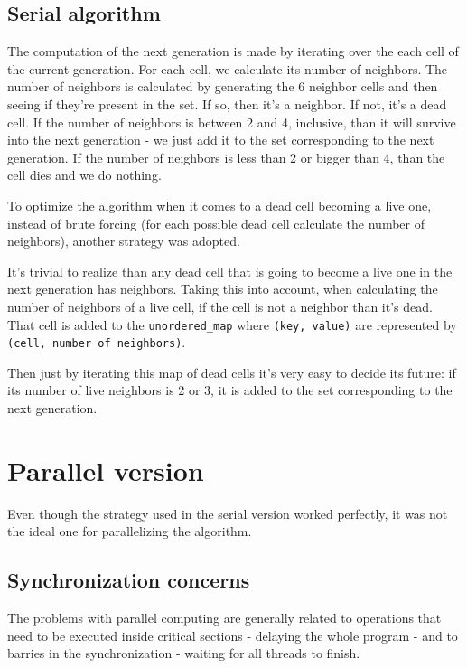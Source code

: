 \documentclass[11pt,english]{article}
\begin{document}
\subsection{Serial algorithm}

The computation of the next generation is made by iterating over the each cell 
of the current generation. For each cell, we calculate its number of neighbors.
The number of neighbors is calculated by generating the 6 neighbor cells and 
then seeing if they're present in the set. If so, then it's a neighbor. If not, 
it's a dead cell.
If the number of neighbors is between 2 and 4, inclusive, than it will survive 
into the next generation - we just add it to the set corresponding to the next 
generation. If the number of neighbors is less than 2 or bigger than 4, than 
the cell dies and we do nothing. 

To optimize the algorithm when it comes to a dead cell becoming a live one, 
instead of brute forcing (for each possible dead cell calculate the number of 
neighbors), another strategy was adopted. 

It's trivial to realize than any dead cell that is going to become a live one 
in the next generation has neighbors. Taking this into account, when calculating 
the number of neighbors of a live cell, if the cell is not a neighbor than it's
dead. That cell is added to the \texttt{unordered\_map} where 
\texttt{(key, value)} are represented by \texttt{(cell, number of neighbors)}. 

Then just by iterating this map of dead cells it's very easy to decide its 
future: if its number of live neighbors is 2 or 3, it is added to the set 
corresponding to the next generation.

\section{Parallel version}

Even though the strategy used in the serial version worked perfectly, it was 
not the ideal one for parallelizing the algorithm. 

\subsection{Synchronization concerns}

The problems with parallel computing are generally related to operations that 
need to be executed inside critical sections - delaying the whole program - and 
to barries in the synchronization - waiting for all threads to finish. 
\end{document}
